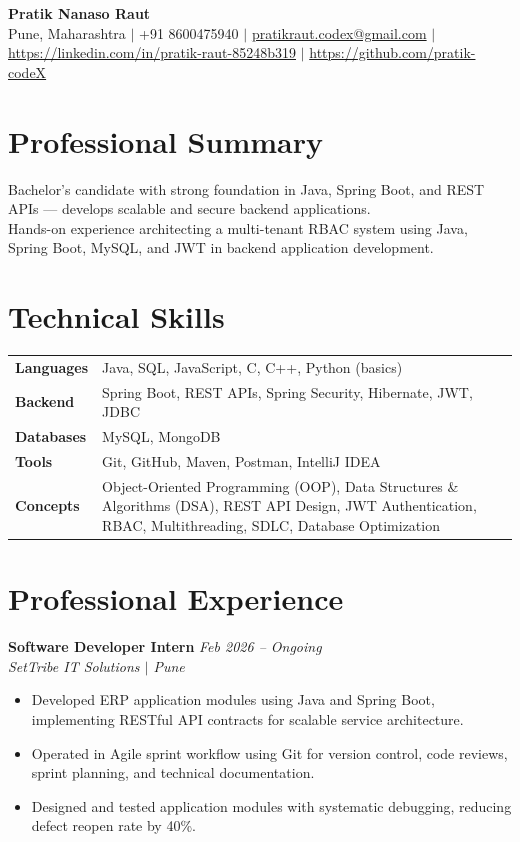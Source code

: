 \documentclass[10.5pt,a4paper]{article}
\begin{document}
\begin{center}
{\Large\bfseries Pratik Nanaso Raut}\\[2pt]
Pune, Maharashtra $|$ +91 8600475940 $|$ \href{mailto:pratikraut.codex@gmail.com}{pratikraut.codex@gmail.com} $|$ \href{https://linkedin.com/in/pratik-raut-85248b319}{https://linkedin.com/in/pratik-raut-85248b319} $|$ \href{https://github.com/pratik-codeX}{https://github.com/pratik-codeX}
\end{center}
\vspace{-2pt}
\section{Professional Summary}
Bachelor's candidate with strong foundation in Java, Spring Boot, and REST APIs — develops scalable and secure backend applications.\\[2pt]
Hands-on experience architecting a multi-tenant RBAC system using Java, Spring Boot, MySQL, and JWT in backend application development.
\section{Technical Skills}
\begin{tabular}{@{}p{}p{}@{}}
\textbf{Languages} & Java, SQL, JavaScript, C, C++, Python (basics) \\[1pt]
\textbf{Backend} & Spring Boot, REST APIs, Spring Security, Hibernate, JWT, JDBC \\[1pt]
\textbf{Databases} & MySQL, MongoDB \\[1pt]
\textbf{Tools} & Git, GitHub, Maven, Postman, IntelliJ IDEA \\[1pt]
\textbf{Concepts} & Object-Oriented Programming (OOP), Data Structures \& Algorithms (DSA), REST API Design, JWT Authentication, RBAC, Multithreading, SDLC, Database Optimization \\
\end{tabular}
\section{Professional Experience}
\textbf{Software Developer Intern} \hfill \textit{Feb 2026 -- Ongoing}
\\\textit{SetTribe IT Solutions $|$ Pune}
\begin{itemize}
  \item Developed ERP application modules using Java and Spring Boot, implementing RESTful API contracts for scalable service architecture.
  \item Operated in Agile sprint workflow using Git for version control, code reviews, sprint planning, and technical documentation.
  \item Designed and tested application modules with systematic debugging, reducing defect reopen rate by 40\%.
\end{itemize}
\end{document}
